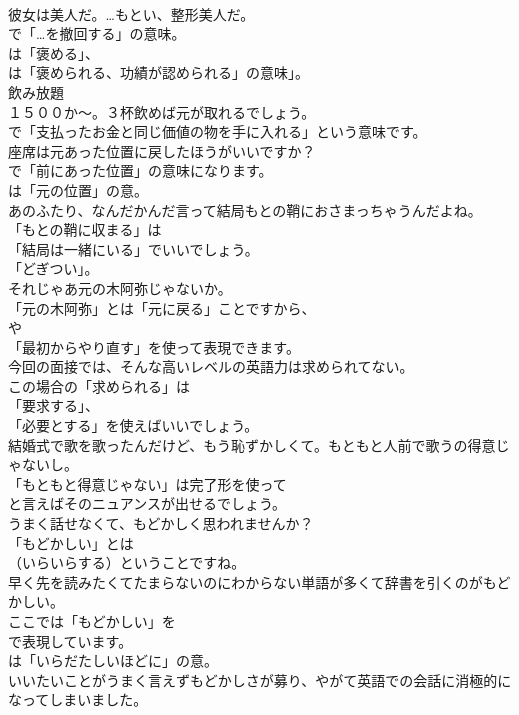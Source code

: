 \documentclass[8pt]{extreport}
\begin{document}
\begin{CJK}{UTF8}{min}
\\	彼女は美人だ。…もとい、整形美人だ。 
\\	で「…を撤回する」の意味。
\\	は「褒める」、
\\	は「褒められる、功績が認められる」の意味」。	
\\	飲み放題
\\	１５００か～。３杯飲めば元が取れるでしょう。 
\\	で「支払ったお金と同じ価値の物を手に入れる」という意味です。	
\\	座席は元あった位置に戻したほうがいいですか？ 
\\	で「前にあった位置」の意味になります。
\\	は「元の位置」の意。	
\\	あのふたり、なんだかんだ言って結局もとの鞘におさまっちゃうんだよね。 
\\	「もとの鞘に収まる」は
\\	「結局は一緒にいる」でいいでしょう。
\\	「どぎつい」。	
\\	それじゃあ元の木阿弥じゃないか。 
\\	「元の木阿弥」とは「元に戻る」ことですから、
\\	や
\\	「最初からやり直す」を使って表現できます。	
\\	今回の面接では、そんな高いレベルの英語力は求められてない。 
\\	この場合の「求められる」は
\\	「要求する」、
\\	「必要とする」を使えばいいでしょう。	
\\	結婚式で歌を歌ったんだけど、もう恥ずかしくて。もともと人前で歌うの得意じゃないし。 
\\	「もともと得意じゃない」は完了形を使って
\\	と言えばそのニュアンスが出せるでしょう。	
\\	うまく話せなくて、もどかしく思われませんか？ 
\\	「もどかしい」とは 
\\	（いらいらする）ということですね。	
\\	早く先を読みたくてたまらないのにわからない単語が多くて辞書を引くのがもどかしい。 
\\	ここでは「もどかしい」を 
\\	で表現しています。
\\	は「いらだたしいほどに」の意。	
\\	いいたいことがうまく言えずもどかしさが募り、やがて英語での会話に消極的になってしまいました。 

\end{CJK}
\end{document}
